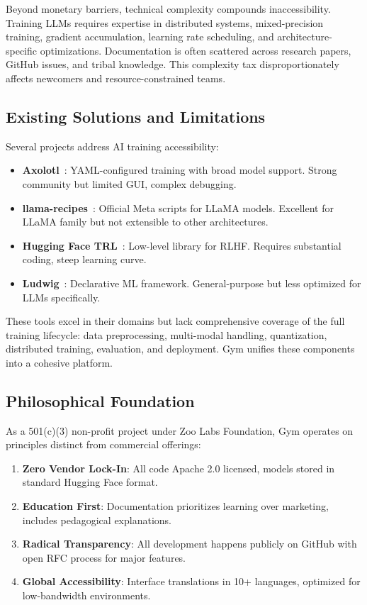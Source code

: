 \documentclass[11pt,letterpaper]{article}
\begin{document}
Beyond monetary barriers, technical complexity compounds inaccessibility. Training LLMs requires expertise in distributed systems, mixed-precision training, gradient accumulation, learning rate scheduling, and architecture-specific optimizations. Documentation is often scattered across research papers, GitHub issues, and tribal knowledge. This complexity tax disproportionately affects newcomers and resource-constrained teams.

\subsection{Existing Solutions and Limitations}

Several projects address AI training accessibility:

\begin{itemize}
\item \textbf{Axolotl}~\citep{axolotl2024}: YAML-configured training with broad model support. Strong community but limited GUI, complex debugging.
\item \textbf{llama-recipes}~\citep{meta2024llamarecipes}: Official Meta scripts for LLaMA models. Excellent for LLaMA family but not extensible to other architectures.
\item \textbf{Hugging Face TRL}~\citep{vonwerra2022trl}: Low-level library for RLHF. Requires substantial coding, steep learning curve.
\item \textbf{Ludwig}~\citep{molino2019ludwig}: Declarative ML framework. General-purpose but less optimized for LLMs specifically.
\end{itemize}

These tools excel in their domains but lack comprehensive coverage of the full training lifecycle: data preprocessing, multi-modal handling, quantization, distributed training, evaluation, and deployment. Gym unifies these components into a cohesive platform.

\subsection{Philosophical Foundation}

As a 501(c)(3) non-profit project under Zoo Labs Foundation, Gym operates on principles distinct from commercial offerings:

\begin{enumerate}
\item \textbf{Zero Vendor Lock-In}: All code Apache 2.0 licensed, models stored in standard Hugging Face format.
\item \textbf{Education First}: Documentation prioritizes learning over marketing, includes pedagogical explanations.
\item \textbf{Radical Transparency}: All development happens publicly on GitHub with open RFC process for major features.
\item \textbf{Global Accessibility}: Interface translations in 10+ languages, optimized for low-bandwidth environments.
\end{enumerate}
\end{document}
